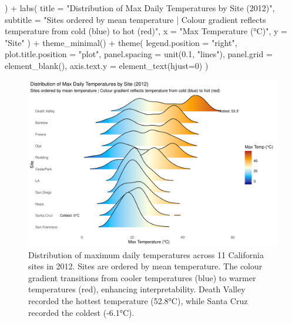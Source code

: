 \documentclass[
  11pt,
]{article}
\newenvironment{Shaded}{\begin{snugshade}}{\end{snugshade}}
\newcommand{\AttributeTok}[1]{\textcolor[rgb]{0.40,0.45,0.13}{#1}}
\newcommand{\DecValTok}[1]{\textcolor[rgb]{0.68,0.00,0.00}{#1}}
\newcommand{\FloatTok}[1]{\textcolor[rgb]{0.68,0.00,0.00}{#1}}
\newcommand{\FunctionTok}[1]{\textcolor[rgb]{0.28,0.35,0.67}{#1}}
\newcommand{\NormalTok}[1]{\textcolor[rgb]{0.00,0.23,0.31}{#1}}
\newcommand{\SpecialCharTok}[1]{\textcolor[rgb]{0.37,0.37,0.37}{#1}}
\newcommand{\StringTok}[1]{\textcolor[rgb]{0.13,0.47,0.30}{#1}}
\begin{document}
\begin{Shaded}
\begin{Highlighting}[]
\NormalTok{  ) }\SpecialCharTok{+}
  \FunctionTok{labs}\NormalTok{(}
    \AttributeTok{title =} \StringTok{"Distribution of Max Daily Temperatures by Site (2012)"}\NormalTok{,}
    \AttributeTok{subtitle =} \StringTok{"Sites ordered by mean temperature | Colour gradient reflects temperature from cold (blue) to hot (red)"}\NormalTok{,}
    \AttributeTok{x =} \StringTok{"Max Temperature (°C)"}\NormalTok{,}
    \AttributeTok{y =} \StringTok{"Site"}
\NormalTok{  ) }\SpecialCharTok{+}
 \FunctionTok{theme\_minimal}\NormalTok{() }\SpecialCharTok{+}
\FunctionTok{theme}\NormalTok{(}
  \AttributeTok{legend.position =} \StringTok{"right"}\NormalTok{,}
  \AttributeTok{plot.title.position =} \StringTok{"plot"}\NormalTok{,}
  \AttributeTok{panel.spacing =} \FunctionTok{unit}\NormalTok{(}\FloatTok{0.1}\NormalTok{, }\StringTok{"lines"}\NormalTok{),}
  \AttributeTok{panel.grid =} \FunctionTok{element\_blank}\NormalTok{(),}
  \AttributeTok{axis.text.y =} \FunctionTok{element\_text}\NormalTok{(}\AttributeTok{hjust=}\DecValTok{0}\NormalTok{)}
\NormalTok{)}
\end{Highlighting}
\end{Shaded}

\begin{figure}[H]

{\centering \includegraphics{project_files/figure-pdf/ca_temp_ridgeline-1.pdf}

}

\caption{Distribution of maximum daily temperatures across 11 California
sites in 2012. Sites are ordered by mean temperature. The colour
gradient transitions from cooler temperatures (blue) to warmer
temperatures (red), enhancing interpretability. Death Valley recorded
the hottest temperature (52.8°C), while Santa Cruz recorded the coldest
(-6.1°C).}

\end{figure}%
\end{document}
